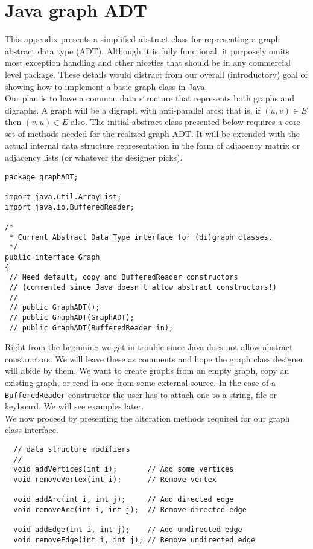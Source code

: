 \chapter{Java graph ADT}
\label{app:javagraph}

This appendix presents a
simplified abstract class for representing a graph abstract data type
(ADT).  Although it is fully functional, it purposely omits most exception
handling and other niceties that should be in any commercial level
package.  These details would distract from our overall (introductory)
goal of showing how to implement a basic graph class in Java.\\

Our plan is to have a common data structure that represents both graphs
and digraphs.  A graph will be a digraph with anti-parallel arcs; that
is, if $(u,v) \in E$ then $(v,u) \in E$ also. The initial abstract class
presented below requires a core set of methods needed for the realized
graph ADT.  It will be extended with the actual internal data structure
representation in the form of adjacency matrix or adjacency lists (or
whatever the designer picks).

{\renewcommand{\ttdefault}{pcr} %
\footnotesize%
\begin{verbatim}
package graphADT;

import java.util.ArrayList;
import java.io.BufferedReader;

/*
 * Current Abstract Data Type interface for (di)graph classes.
 */
public interface Graph 
{
 // Need default, copy and BufferedReader constructors
 // (commented since Java doesn't allow abstract constructors!)
 //
 // public GraphADT(); 
 // public GraphADT(GraphADT); 
 // public GraphADT(BufferedReader in);
\end{verbatim}%
}

Right from the beginning we get in trouble since Java does not allow
abstract constructors.   We will leave these as comments and hope the
graph class designer will abide by them.   We want to create graphs
from an empty graph, copy an existing graph, or read in one from some
external source.   In the case of a  \verb|BufferedReader| constructor
the user has to attach one to a string,  file or keyboard.   We will
see examples later.\\

We now proceed by presenting the alteration methods required for our 
graph class interface.

{\renewcommand{\ttdefault}{pcr} %
\footnotesize \begin{verbatim}
  // data structure modifiers
  //
  void addVertices(int i);       // Add some vertices
  void removeVertex(int i);      // Remove vertex

  void addArc(int i, int j);     // Add directed edge
  void removeArc(int i, int j);  // Remove directed edge

  void addEdge(int i, int j);    // Add undirected edge
  void removeEdge(int i, int j); // Remove undirected edge
\end{verbatim}%
}

